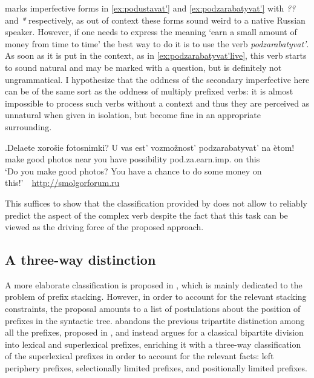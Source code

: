 \cite{Kagan:book} marks imperfective forms in \ref{ex:podustavat'} and \ref{ex:podzarabatyvat'} with \textit{??} and \textit{*} respectively, as out of context these forms sound weird to a native Russian speaker. However, if one needs to express the meaning `earn a small amount of money from time to time' the best way to do it is to use the verb \textit{podzarabatyvat'}. As soon as it is put in the context, as in \ref{ex:podzarabatyvat'live}, this verb starts to sound natural and may be marked with a question, but is definitely not ungrammatical. I hypothesize that the oddness of the secondary imperfective here can be of the same sort as the oddness of multiply prefixed verbs: it is almost impossible to process such verbs without a context and thus they are perceived as unnatural when given in isolation, but become fine in an appropriate surrounding.

\exg.\label{ex:podzarabatyvat'live}Delaete xoro\v{s}ie fotosnimki? U vas est' vozmo\v{z}nost' podzarabatyvat' na \`{e}tom!\\
make good photos near you have possibility pod.za.earn.imp. on this\\
\trans `Do you make good photos? You have a chance to do some money on this!'~~\hbox{}\hfill\hbox{\url{http://smolgorforum.ru}}

This suffices to show that the classification provided by \citet{Tatevosov:07} does not allow to reliably predict the aspect of the complex verb despite the fact that this task can be viewed as the driving force of the proposed approach. 

\subsection{A three-way distinction}\label{section:Tat09}
A more elaborate classification is proposed in \citealt{Tatevosov:09}, which is mainly dedicated to the problem of prefix stacking. However, in order to account for the relevant stacking constraints, the proposal amounts to a list of postulations about the position of prefixes in the syntactic tree. \citet{Tatevosov:09} abandons the previous tripartite distinction among all the prefixes, proposed in \citet{Tatevosov:07}, and instead argues for a classical bipartite division into lexical and superlexical prefixes, enriching it with a three-way classification of the superlexical prefixes in order to account for the relevant facts: left periphery prefixes, selectionally limited prefixes, and positionally limited prefixes.


